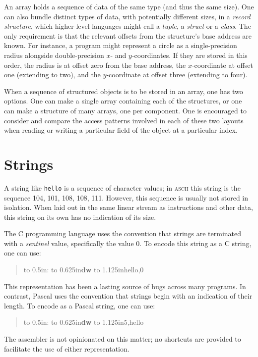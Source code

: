 \documentclass[12pt,english]{book}
\newcommand*{\asmstyle}{\noindent\ttfamily\selectfont\small}
\newcommand*{\asmline}[3][]{%
\null\hbox to 0.5in{\ifx#1\empty\else{#1}:\fi\hss}%
\hbox to 0.625in{\textbf{#2}\hss}%
\hbox to 1.125in{#3\hss}}
\newcommand*{\concept}[2][]{%
  \textit{#2}\ifx#1\empty\empty\index{#2}\else\index{#1}\fi}
\begin{document}
An array holds a sequence of data of the same type
(and thus the same size).
One can also bundle distinct types of data,
with potentially different sizes,
in a \concept{record structure},
which higher-level languages might call
a \emph{tuple}, a \emph{struct} or a \emph{class}.
The only requirement is that the relevant offsets
from the structure's base address
are known.
For instance, a program might represent a circle
as a single-precision radius
alongside double-precision \(x\)- and \(y\)-coordinates.
If they are stored in this order,
the radius is at offset zero from the base address,
the \(x\)-coordinate at offset one (extending to two),
and the \(y\)-coordinate at offset three (extending to four).

When a sequence of structured objects is to be stored in an array,
one has two options.
One can make a single array containing each of the structures,
or one can make a structure of many arrays, one per component.
One is encouraged to consider and compare the access patterns involved
in each of these two layouts
when reading or writing a particular field of the object
at a particular index.

\section{Strings}
A string like \texttt{\textquotedbl hello\textquotedbl}
is a sequence of character values;
in \textsc{ascii} this string is the sequence
104, 101, 108, 108, 111.
However, this sequence is usually not stored in isolation.
When laid out in the same linear stream
as instructions and other data,
this string on its own has no indication of its size.

The C programming language uses the convention
that strings are terminated with a \emph{sentinel} value,
specifically the value 0.
To encode this string as a C string, one can use:
\begin{quote}\asmstyle
\asmline{dw}{\textquotedbl hello\textquotedbl,0}
\end{quote}
This representation has been a lasting source of bugs
across many programs.
In contrast, Pascal uses the convention
that strings begin with an indication of their length.
To encode as a Pascal string, one can use:
\begin{quote}\asmstyle
\asmline{dw}{5,\textquotedbl hello\textquotedbl}
\end{quote}
The assembler is not opinionated on this matter;
no shortcuts are provided to facilitate
the use of either representation.
\end{document}
